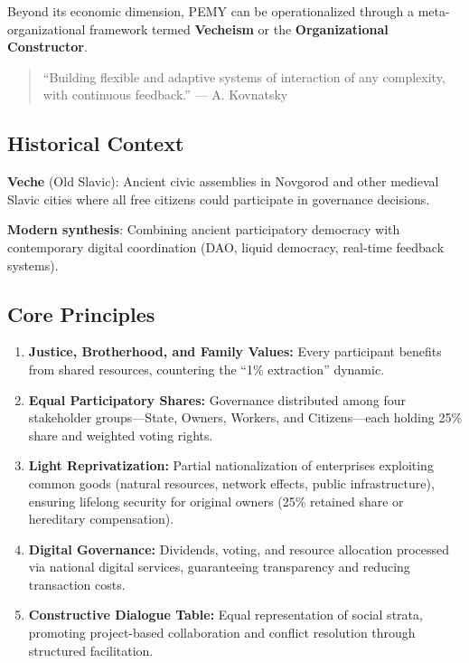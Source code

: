 \documentclass[11pt,a4paper]{article}
\theoremstyle{definition}
\theoremstyle{remark}
\begin{document}
Beyond its economic dimension, PEMY can be operationalized through a meta-organizational framework termed \textbf{Vecheism} or the \textbf{Organizational Constructor}.

\begin{quote}
``Building flexible and adaptive systems of interaction of any complexity, with continuous feedback.'' --- A. Kovnatsky
\end{quote}

\subsection{Historical Context}

\textbf{Veche} (Old Slavic): Ancient civic assemblies in Novgorod and other medieval Slavic cities where all free citizens could participate in governance decisions.

\textbf{Modern synthesis}: Combining ancient participatory democracy with contemporary digital coordination (DAO, liquid democracy, real-time feedback systems).

\subsection{Core Principles}

\begin{enumerate}[leftmargin=1.5em]
    \item \textbf{Justice, Brotherhood, and Family Values:} Every participant benefits from shared resources, countering the ``1\% extraction'' dynamic.
    
    \item \textbf{Equal Participatory Shares:} Governance distributed among four stakeholder groups---State, Owners, Workers, and Citizens---each holding 25\% share and weighted voting rights.
    
    \item \textbf{Light Reprivatization:} Partial nationalization of enterprises exploiting common goods (natural resources, network effects, public infrastructure), ensuring lifelong security for original owners (25\% retained share or hereditary compensation).
    
    \item \textbf{Digital Governance:} Dividends, voting, and resource allocation processed via national digital services, guaranteeing transparency and reducing transaction costs.
    
    \item \textbf{Constructive Dialogue Table:} Equal representation of social strata, promoting project-based collaboration and conflict resolution through structured facilitation.
\end{enumerate}
\end{document}
